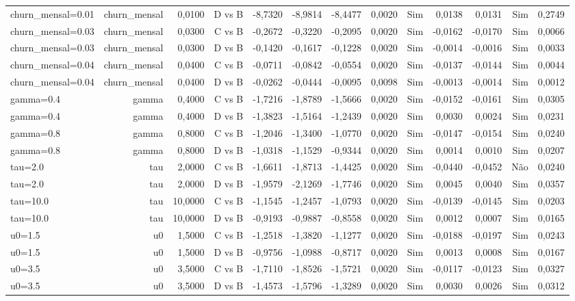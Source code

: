 \begin{table}[ht]
\begin{tabular}{lrrrrrrrrrrrr}
churn\_mensal=0.01 & churn\_mensal & 0,0100 & D vs B & -8,7320 & -8,9814 & -8,4477 & 0,0020 & Sim & 0,0138 & 0,0131 & Sim & 0,2749 \\
churn\_mensal=0.03 & churn\_mensal & 0,0300 & C vs B & -0,2672 & -0,3220 & -0,2095 & 0,0020 & Sim & -0,0162 & -0,0170 & Sim & 0,0066 \\
churn\_mensal=0.03 & churn\_mensal & 0,0300 & D vs B & -0,1420 & -0,1617 & -0,1228 & 0,0020 & Sim & -0,0014 & -0,0016 & Sim & 0,0033 \\
churn\_mensal=0.04 & churn\_mensal & 0,0400 & C vs B & -0,0711 & -0,0842 & -0,0554 & 0,0020 & Sim & -0,0137 & -0,0144 & Sim & 0,0044 \\
churn\_mensal=0.04 & churn\_mensal & 0,0400 & D vs B & -0,0262 & -0,0444 & -0,0095 & 0,0098 & Sim & -0,0013 & -0,0014 & Sim & 0,0012 \\
gamma=0.4 & gamma & 0,4000 & C vs B & -1,7216 & -1,8789 & -1,5666 & 0,0020 & Sim & -0,0152 & -0,0161 & Sim & 0,0305 \\
gamma=0.4 & gamma & 0,4000 & D vs B & -1,3823 & -1,5164 & -1,2439 & 0,0020 & Sim & 0,0030 & 0,0024 & Sim & 0,0231 \\
gamma=0.8 & gamma & 0,8000 & C vs B & -1,2046 & -1,3400 & -1,0770 & 0,0020 & Sim & -0,0147 & -0,0154 & Sim & 0,0240 \\
gamma=0.8 & gamma & 0,8000 & D vs B & -1,0318 & -1,1529 & -0,9344 & 0,0020 & Sim & 0,0014 & 0,0010 & Sim & 0,0207 \\
tau=2.0 & tau & 2,0000 & C vs B & -1,6611 & -1,8713 & -1,4425 & 0,0020 & Sim & -0,0440 & -0,0452 & Não & 0,0240 \\
tau=2.0 & tau & 2,0000 & D vs B & -1,9579 & -2,1269 & -1,7746 & 0,0020 & Sim & 0,0045 & 0,0040 & Sim & 0,0357 \\
tau=10.0 & tau & 10,0000 & C vs B & -1,1545 & -1,2457 & -1,0793 & 0,0020 & Sim & -0,0139 & -0,0145 & Sim & 0,0203 \\
tau=10.0 & tau & 10,0000 & D vs B & -0,9193 & -0,9887 & -0,8558 & 0,0020 & Sim & 0,0012 & 0,0007 & Sim & 0,0165 \\
u0=1.5 & u0 & 1,5000 & C vs B & -1,2518 & -1,3820 & -1,1277 & 0,0020 & Sim & -0,0188 & -0,0197 & Sim & 0,0243 \\
u0=1.5 & u0 & 1,5000 & D vs B & -0,9756 & -1,0988 & -0,8717 & 0,0020 & Sim & 0,0013 & 0,0008 & Sim & 0,0167 \\
u0=3.5 & u0 & 3,5000 & C vs B & -1,7110 & -1,8526 & -1,5721 & 0,0020 & Sim & -0,0117 & -0,0123 & Sim & 0,0327 \\
u0=3.5 & u0 & 3,5000 & D vs B & -1,4573 & -1,5796 & -1,3289 & 0,0020 & Sim & 0,0030 & 0,0026 & Sim & 0,0312 \\

\end{tabular}
\end{table}
